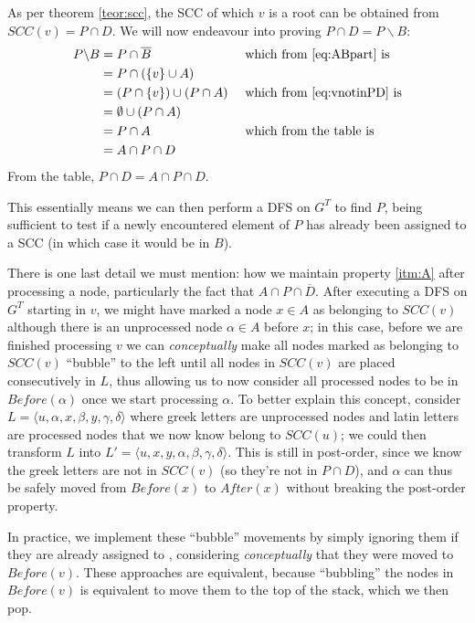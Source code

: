 As per theorem \ref{teor:scc}, the \acrshort*{SCC} of which $v$ is a root can be obtained from $SCC(v)=P \cap D$. We will now endeavour into proving $P \cap D = P \backslash B$:
\begin{alignat*}{2}
    P \backslash B &= P \cap \overline{B}&&\text{ which from \eqref{eq:ABpart} is} \\
                   &= P \cap (\{v\} \cup A) && \\
                   &= (P \cap \{v\}) \cup (P \cap A)&&\text{ which from \eqref{eq:vnotinPD} is}\\
                   &= \emptyset \cup (P \cap A)&&\\
                   &= P \cap A &&\text{ which from the table is }\\
                   &= A \cap P \cap D &&
\end{alignat*}
From the table, $P \cap D = A \cap P \cap D$.\par
This essentially means we can then perform a \acrshort*{DFS} on $G^T$ to find $P$, being sufficient to test if a newly encountered element of $P$ has already been assigned to a \acrshort*{SCC} (in which case it would be in $B$).\par
There is one last detail we must mention: how we maintain property \ref{itm:A} after processing a node, particularly the fact that \sout{$A \cap P \cap \overline{D}$}. After executing a \acrshort*{DFS} on $G^T$ starting in $v$, we might have marked a node $x \in A$ as belonging to $SCC(v)$ although there is an unprocessed node $\alpha \in A$ before $x$; in this case, before we are finished processing $v$ we can \emph{conceptually} make all nodes marked as belonging to $SCC(v)$ ``bubble'' to the left until all nodes in $SCC(v)$ are placed consecutively in $L$, thus allowing us to now consider all processed nodes to be in $Before(\alpha)$ once we start processing $\alpha$. To better explain this concept, consider $L=\langle u, \alpha, x, \beta, y, \gamma, \delta \rangle $ where greek letters are unprocessed nodes and latin letters are processed nodes that we now know belong to $SCC(u)$; we could then transform $L$ into $L'=\langle u, x, y, \alpha, \beta, \gamma, \delta \rangle$. This is still in post-order, since we know the greek letters are not in $SCC(v)$ (so they're not in $P \cap D$), and $\alpha$ can thus be safely moved from $Before(x)$ to $After(x)$ without breaking the post-order property.\par
In practice, we implement these ``bubble'' movements by simply ignoring them if they are already assigned to , considering \emph{conceptually} that they were moved to $Before(v)$. These approaches are equivalent, because ``bubbling'' the nodes in $Before(v)$ is equivalent to move them to the top of the stack, which we then pop. 

